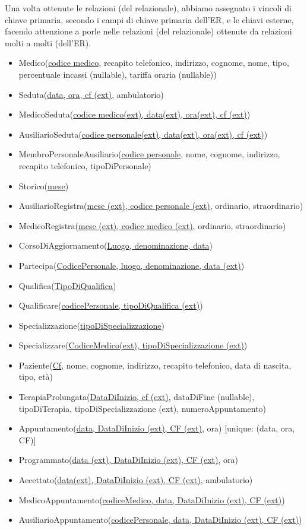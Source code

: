\documentclass[11pt]{article}
\begin{document}
Una volta ottenute le relazioni (del relazionale), abbiamo assegnato i vincoli di chiave primaria, secondo i campi di chiave primaria dell'ER, e le chiavi esterne, facendo attenzione a porle nelle relazioni (del relazionale) ottenute da relazioni molti a molti (dell'ER).

\begin{itemize}
    \item Medico(\underline{codice medico}, recapito telefonico, indirizzo, cognome, nome, tipo, percentuale incassi (nullable), tariffa oraria (nullable))
    \item Seduta(\underline{data, ora, cf (ext)}, ambulatorio)
    \item MedicoSeduta(\underline{codice medico(ext), data(ext), ora(ext), cf (ext)})
    \item AusiliarioSeduta(\underline{codice personale(ext), data(ext), ora(ext), cf (ext)})
    \item MembroPersonaleAusiliario(\underline{codice personale}, nome, cognome, indirizzo, recapito telefonico, tipoDiPersonale)
    \item Storico(\underline{mese})
    \item AusiliarioRegistra(\underline{mese (ext), codice personale (ext)}, ordinario, straordinario)
    \item MedicoRegistra(\underline{mese (ext), codice medico (ext)}, ordinario, straordinario)
    \item CorsoDiAggiornamento(\underline{Luogo, denominazione, data})
    \item Partecipa(\underline{CodicePersonale, luogo, denominazione, data (ext)})
    \item Qualifica(\underline{TipoDiQualifica})
    \item Qualificare(\underline{codicePersonale, tipoDiQualifica (ext)})
    \item Specializzazione(\underline{tipoDiSpecializzazione})
    \item Specializzare(\underline{CodiceMedico(ext), tipoDiSpecializzazione (ext)})
    \item Paziente(\underline{Cf}, nome, cognome, indirizzo, recapito telefonico, data di nascita, tipo, età)
    \item TerapiaProlungata(\underline{DataDiInizio, cf (ext)}, dataDiFine (nullable), tipoDiTerapia, tipoDiSpecializzazione (ext), numeroAppuntamento)
    \item Appuntamento(\underline{data, DataDiInizio (ext), CF (ext)}, ora) [unique: (data, ora, CF)]
    \item Programmato(\underline{data (ext), DataDiInizio (ext), CF (ext)}, ora)
    \item Accettato(\underline{data(ext), DataDiInizio (ext), CF (ext)}, ambulatorio)
    \item MedicoAppuntamento(\underline{codiceMedico, data, DataDiInizio (ext), CF (ext)})
    \item AusiliarioAppuntamento(\underline{codicePersonale, data, DataDiInizio (ext), CF (ext)})
\end{itemize}
\end{document}
